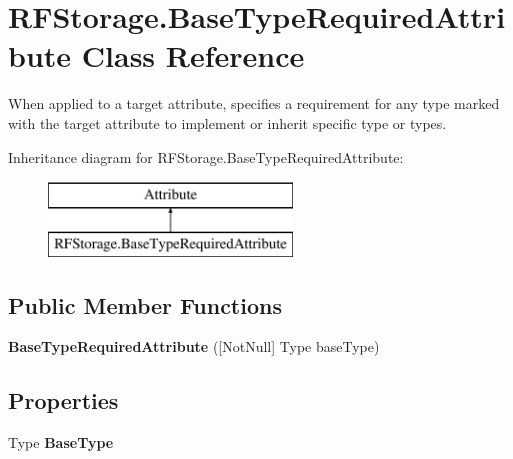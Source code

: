\hypertarget{class_r_f_storage_1_1_base_type_required_attribute}{}\section{R\+F\+Storage.\+Base\+Type\+Required\+Attribute Class Reference}
\label{class_r_f_storage_1_1_base_type_required_attribute}


When applied to a target attribute, specifies a requirement for any type marked with the target attribute to implement or inherit specific type or types.  


Inheritance diagram for R\+F\+Storage.\+Base\+Type\+Required\+Attribute\+:\begin{figure}[H]
\begin{center}
\leavevmode
\includegraphics[height=2.000000cm]{class_r_f_storage_1_1_base_type_required_attribute}
\end{center}
\end{figure}
\subsection*{Public Member Functions}
\begin{DoxyCompactItemize}
\item 
\mbox{\label{class_r_f_storage_1_1_base_type_required_attribute_a6a120f605834d99741a274e39f1d8df8}} 
{\bfseries Base\+Type\+Required\+Attribute} (\mbox{[}Not\+Null\mbox{]} Type base\+Type)
\end{DoxyCompactItemize}
\subsection*{Properties}
\begin{DoxyCompactItemize}
\item 
\mbox{\label{class_r_f_storage_1_1_base_type_required_attribute_a24f55f70d785f960dabef947a11a84f2}} 
Type {\bfseries Base\+Type}
\end{DoxyCompactItemize}


